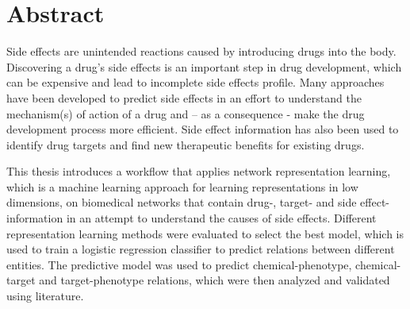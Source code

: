 \chapter*{Abstract}

Side effects are unintended reactions caused by introducing drugs into the body. Discovering a drug’s side effects is an important step in drug development, which can be expensive and lead to incomplete side effects profile. Many approaches have been developed to predict side effects in an effort to understand the mechanism(s) of action of a drug and – as a consequence - make the drug development process more efficient. Side effect information has also been used to identify drug targets and find new therapeutic benefits for existing drugs.

This thesis introduces a workflow that applies network representation learning, which is a machine learning approach for learning representations in low dimensions, on biomedical networks that contain drug-, target- and side effect-information in an attempt to understand the causes of side effects. Different representation learning methods were evaluated to select the best model, which is used to train a logistic regression classifier to predict relations between different entities. The predictive model was used to predict chemical-phenotype, chemical-target and target-phenotype relations, which were then analyzed and validated using literature. 